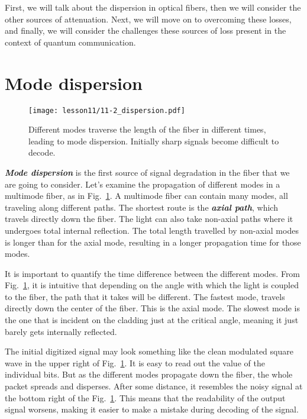 First, we will talk about the dispersion in optical fibers, then we will consider the other sources of attenuation. Next, we will move on to overcoming these losses, and finally, we will consider the challenges these sources of loss present in the context of quantum communication.





\section{Mode dispersion}
\label{sec:11-2_mode_dispersion}
\begin{figure}
    \centering
    \texttt{[image: lesson11/11-2\_dispersion.pdf]}
    \caption[Mode dispersion.]{Different modes traverse the length of the fiber in different times, leading to mode dispersion. Initially sharp signals become difficult to decode.}
    \label{fig:11-2_mode_dispersion}
\end{figure}
\textbf{\emph{Mode dispersion}} is the first source of signal degradation in the fiber that we are going to consider.
Let's examine the propagation of different modes in a multimode fiber, as in Fig.~\ref{fig:11-2_mode_dispersion}.
A multimode fiber can contain many modes, all traveling along different paths.
The shortest route is the \textbf{\emph{axial path}}, which travels directly down the fiber.
The light can also take non-axial paths where it undergoes total internal reflection.
The total length travelled by non-axial modes is longer than for the axial mode, resulting in a longer propagation time for those modes.

It is important to quantify the time difference between the different modes.
From Fig.~\ref{fig:11-2_mode_dispersion}, it is intuitive that depending on the angle with which the light is coupled to the fiber, the path that it takes will be different.
The fastest mode, travels directly down the center of the fiber.
This is the axial mode.
The slowest mode is the one that is incident on the cladding just at the critical angle, meaning it just barely gets internally reflected.

The initial digitized signal may look something like the clean modulated square wave in the upper right of Fig.~\ref{fig:11-2_mode_dispersion}. It is easy to read out the value of the individual bits.
But as the different modes propagate down the fiber, the whole packet spreads and disperses.
After some distance, it resembles the noisy signal at the bottom right of the Fig.~\ref{fig:11-2_mode_dispersion}.
This means that the readability of the output signal worsens, making it easier to make a mistake during decoding of the signal.

